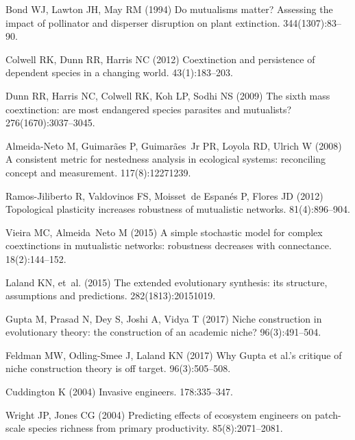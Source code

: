 \documentclass[9pt,twocolumn,twoside]{pnas-new}
\begin{document}
\begin{thebibliography}{10}
Bond WJ, Lawton JH, May RM (1994) Do mutualisms matter? {A}ssessing the impact
  of pollinator and disperser disruption on plant extinction.
 344(1307):83--90.

Colwell RK, Dunn RR, Harris NC (2012) Coextinction and persistence of dependent
  species in a changing world.
 43(1):183--203.

Dunn RR, Harris NC, Colwell RK, Koh LP, Sodhi NS (2009) The sixth mass
  coextinction: are most endangered species parasites and mutualists?
 276(1670):3037--3045.

Almeida-Neto M, Guimar{\~a}es P, Guimar{\~a}es~Jr PR, Loyola RD, Ulrich W
  (2008) A consistent metric for nestedness analysis in ecological systems:
  reconciling concept and measurement.
 117(8):1227{\textendash}1239.

Ramos-Jiliberto R, Valdovinos FS, Moisset~de Espanés P, Flores JD (2012)
  Topological plasticity increases robustness of mutualistic networks.
 81(4):896--904.

Vieira MC, Almeida~Neto M (2015) {A simple stochastic model for complex
  coextinctions in mutualistic networks: robustness decreases with
  connectance}.
 18(2):144--152.

Laland KN, et~al. (2015) The extended evolutionary synthesis: its structure,
  assumptions and predictions.
 282(1813):20151019.

Gupta M, Prasad N, Dey S, Joshi A, Vidya T (2017) Niche construction in
  evolutionary theory: the construction of an academic niche?
 96(3):491--504.

Feldman MW, Odling-Smee J, Laland KN (2017) Why {G}upta et al.’s critique of
  niche construction theory is off target.
 96(3):505--508.

Cuddington K (2004) {Invasive engineers}.
 178:335--347.

Wright JP, Jones CG (2004) Predicting effects of ecosystem engineers on
  patch-scale species richness from primary productivity.
 85(8):2071--2081.


\end{thebibliography}
\end{document}

